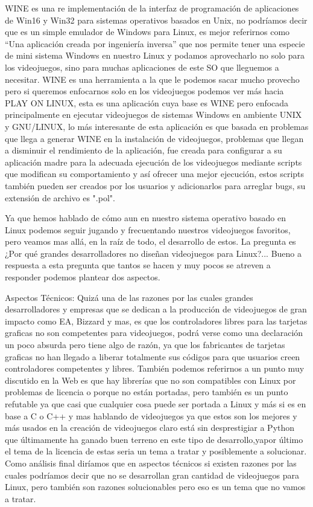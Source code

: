 WINE es una  re implementación de la interfaz de programación de aplicaciones de Win16 y Win32 para sistemas operativos basados en Unix, no podríamos decir que es un simple 
emulador de Windows para Linux, es mejor referirnos como “Una aplicación creada por ingeniería inversa” que nos permite tener una especie de mini sistema Windows en nuestro 
Linux y podamos aprovecharlo no solo para los videojuegos, sino para muchas aplicaciones de este SO que lleguemos a necesitar. WINE es una herramienta a la que le podemos 
sacar mucho provecho pero si queremos enfocarnos solo en los videojuegos podemos ver más hacia PLAY ON LINUX, esta es una aplicación cuya base es WINE pero enfocada 
principalmente en ejecutar videojuegos de sistemas Windows en ambiente UNIX y GNU/LINUX, lo más interesante de esta aplicación es que basada en problemas que llega a 
generar WINE en la instalación de videojuegos, problemas que llegan a disminuir el rendimiento de la aplicación, fue creada para configurar a su aplicación madre para la 
adecuada ejecución de los videojuegos mediante scripts que modifican su comportamiento y así ofrecer una mejor ejecución, estos scripts también pueden ser creados por los 
usuarios y adicionarlos para arreglar bugs, su extensión de archivo es ".pol".

Ya que hemos hablado de cómo aun en nuestro sistema operativo basado en Linux podemos seguir jugando y frecuentando nuestros videojuegos favoritos, pero veamos mas allá, en 
la raíz de todo, el desarrollo de estos. La pregunta es ¿Por qué grandes desarrolladores no diseñan videojuegos para Linux?... Bueno a respuesta a esta pregunta que tantos 
se hacen y muy pocos se atreven a responder podemos plantear dos aspectos.

Aspectos Técnicos: Quizá una de las razones por las cuales grandes desarrolladores y empresas que se dedican a la producción de videojuegos de gran impacto como EA, Bizzard 
y mas, es que los controladores libres para las tarjetas graficas no son competentes para videojuegos, podrá verse como una declaración un poco absurda pero tiene algo 
de razón, ya que los fabricantes de tarjetas graficas no han llegado a liberar totalmente sus códigos para que usuarios creen controladores competentes y libres. También 
podemos referirnos a un punto muy discutido en la Web es que hay librerías que no son compatibles con Linux por problemas de licencia o porque no están portadas, pero 
también es un punto refutable ya que casi que cualquier cosa puede ser portada a Linux y más si es en base a C o C++ y mas hablando de videojuegos ya que estos son los 
mejores y más usados en la creación de videojuegos claro está sin desprestigiar a Python que últimamente ha ganado buen terreno en este tipo de     desarrollo,yapor último 
el tema de la licencia de estas seria un tema a tratar y posiblemente a solucionar. Como análisis final diríamos que en aspectos técnicos si existen razones por las cuales 
podríamos decir que no se desarrollan gran cantidad de videojuegos para Linux, pero también son razones solucionables pero eso es un tema que no vamos a tratar.

